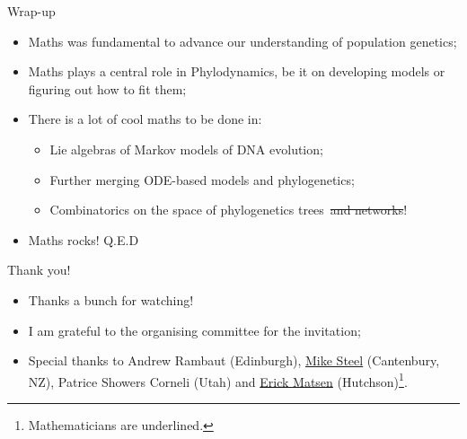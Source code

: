 \begin{frame}{Wrap-up}
 \begin{itemize}
  \item Maths was fundamental to advance our understanding of population genetics;\pause
  \item Maths plays a central role in Phylodynamics, be it on developing models or figuring out how to fit them;\pause
  \item There is a lot of cool maths to be done in:\pause
  \begin{itemize}
   \item Lie algebras of Markov models of DNA evolution;
   \item Further merging ODE-based models and phylogenetics;
   \item[\tikzmark{bl}\textbullet] Combinatorics on the space of phylogenetics trees~\sout{and networks}!
  \end{itemize}
  \pause
  \item Maths rocks! Q.E.D
 \end{itemize}
\end{frame}
\begin{frame}{Thank you!}
\begin{itemize}
 \item Thanks a bunch for watching!
 \item I am grateful to the organising committee for the invitation;
 \item Special thanks to Andrew Rambaut (Edinburgh), \underline{Mike Steel} (Cantenbury, NZ), Patrice Showers Corneli (Utah) and \underline{Erick Matsen} (Hutchson)\footnote{Mathematicians are underlined.}.
\end{itemize}
\end{frame}
